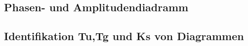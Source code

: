 \subsection{Phasen- und Amplitudendiadramm}
\subsection{Identifikation Tu,Tg und Ks  von Diagrammen}